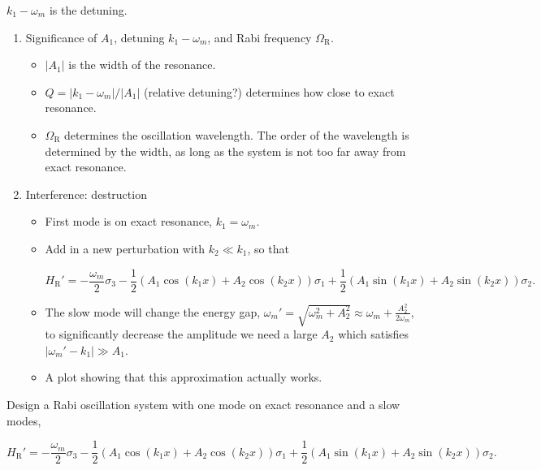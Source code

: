 \documentclass[%
preprint,
 amsmath,amssymb,
 aps,
]{revtex4-1}
\begin{document}
$k_1 - \omega_m$ is the detuning.




\begin{enumerate}
    \item Significance of $A_1$, detuning $k_1 - \omega_m$, and Rabi frequency $\Omega_{\mathrm R}$.
        \begin{itemize}
            \item $\lvert A_1 \rvert$ is the width of the resonance.
            \item $Q = \lvert k_1 - \omega_m \rvert/\lvert A_1 \rvert$ (relative detuning?) determines how close to exact resonance.
            \item $\Omega_{\mathrm R}$ determines the oscillation wavelength. The order of the wavelength is determined by the width, as long as the system is not too far away from exact resonance.
        \end{itemize}
    \item Interference: destruction
        \begin{itemize}
            \item First mode is on exact resonance,  $k_1 = \omega_m$.
            \item Add in a new perturbation with $k_2\ll k_1$, so that
            
            \begin{equation}
            H_{\mathrm R}' = -\frac{\omega_m}{2} \sigma_3 - \frac{1}{2}( A_1 \cos(k_1 x) + A_2 \cos(k_2 x)) \sigma_1 + \frac{1}{2} ( A_1 \sin(k_1 x) + A_2 \sin(k_2 x)   ) \sigma_2.
            \end{equation}
            
            \item The slow mode will change the energy gap, $\omega_m' = \sqrt{\omega_m^2 + A_2^2} \approx \omega_m + \frac{A_2^2}{2\omega_m}$, to significantly decrease the amplitude we need a large $A_2$ which satisfies $\lvert \omega_m' - k_1 \rvert \gg A_1$.
            \item A plot showing that this approximation actually works.
        \end{itemize}
\end{enumerate}


Design a Rabi oscillation system with one mode on exact resonance and a slow modes,

\begin{equation}
H_{\mathrm R}' = -\frac{\omega_m}{2} \sigma_3 - \frac{1}{2}( A_1 \cos(k_1 x) + A_2 \cos(k_2 x)) \sigma_1 + \frac{1}{2} ( A_1 \sin(k_1 x) + A_2 \sin(k_2 x)   ) \sigma_2.
\end{equation}
\end{document}
